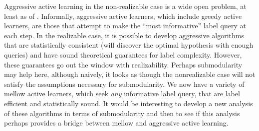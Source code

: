 Aggressive active learning in the non-realizable case is a wide open problem, at least as of \cite{Dasgupta:2011}. Informally, aggressive active learners, which include greedy active learners, are those that attempt to make the ``most informative'' label query at each step. In the realizable case, it is possible to develop aggressive algorithms that are statistically consistent (will discover the optimal hypothesis with enough queries) and have sound theoretical guarantees for label complexity. However, these guarantees go out the window with realizability. Perhaps submodularity may help here, although naively, it looks as though the nonrealizable case will not satisfy the assumptions necessary for submodularity. We now have a variety of mellow active learners, which seek \textit{any} informative label query, that are label efficient and statistically sound. It would be interesting to develop a new analysis of these algorithms in terms of submodularity and then to see if this analysis perhaps provides a bridge between mellow and aggressive active learning.


